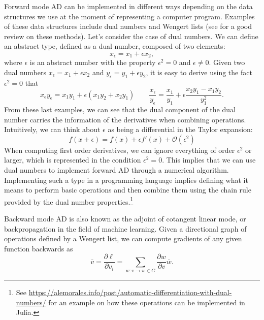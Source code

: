 Forward mode AD can be implemented in different ways depending on the data structures we use at the moment of representing a computer program. Examples of these data structures include dual numbers and Wengert lists (see \cite{Baydin_Pearlmutter_Radul_Siskind_2015} for a good review on these methods). Let's consider the case of dual numbers.
We can define an abstract type, defined as a dual number, composed of two elements:
\begin{equation}
 x_\epsilon = x_1 + \epsilon x_2,
\end{equation}
where $\epsilon$ is an abstract number with the property $\epsilon^2 = 0$ and $\epsilon \neq 0$.
Given two dual numbers $x_\epsilon = x_1 + \epsilon x_2$ and $y_\epsilon = y_1 + \epsilon y_2$, it is easy to derive using the fact $\epsilon^2=0$ that
\begin{equation}
 x_\epsilon y_\epsilon = x_1 y_1 + \epsilon(x_1 y_2 + x_2 y_1) \qquad
 \frac{x_\epsilon}{y_\epsilon} = \frac{x_1}{y_1} + \epsilon \frac{x_2 y_1 - x_1 y_2}{y_1^2}.
\end{equation}
From these last examples, we can see that the dual component of the dual number carries the information of the derivatives when combining operations.
Intuitively, we can think about $\epsilon$ as being a differential in the Taylor expansion:
\begin{equation}
 f(x + \epsilon) = f(x) + \epsilon f'(x) + \mathcal O (\epsilon^2)
\end{equation}
When computing first order derivatives, we can ignore everything of order $\epsilon^2$ or larger, which is represented in the condition $\epsilon^2 = 0$.
This implies that we can use dual numbers to implement forward AD through a numerical algorithm. Implementing such a type in a programming language implies defining what it means to perform basic operations and then combine them using the chain rule provided by the dual number properties.\footnote{See \url{https://alemorales.info/post/automatic-differentiation-with-dual-numbers/} for an example on how these operations can be implemented in Julia.}

Backward mode AD is also known as the adjoint of cotangent linear mode, or backpropagation in the field of machine learning. Given a directional graph of operations defined by a Wengert list, we can compute gradients of any given function backwards as
\begin{equation}
    \bar v = \frac{\partial \ell}{\partial v_i}= \sum_{w : v \rightarrow w \in G} \frac{\partial w}{\partial v} \bar{w}.
\end{equation}

